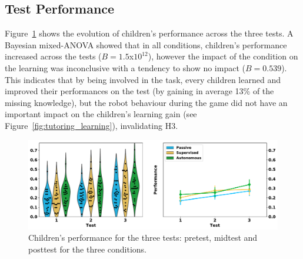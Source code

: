%


\subsection{Test Performance}

Figure~\ref{fig:tutoring_performance} shows the evolution of children's performance across the three tests. A Bayesian mixed-ANOVA showed that in all conditions, children's performance increased across the tests ($B=1.5$x$10^{12}$), however the impact of the condition on the learning was inconclusive with a tendency to show no impact ($B=0.539$). This indicates that by being involved in the task, every children learned and improved their performances on the test (by gaining in average 13\% of the missing knowledge), but the robot behaviour during the game did not have an important impact on the children's learning gain (see Figure~\ref{fig:tutoring_learning}), invalidating H3. %

\begin{figure}[ht]
	\includegraphics[width=1\linewidth]{perf.pdf}
	\centering
	\caption{Children's performance for the three tests: pretest, midtest and posttest for the three conditions.}
	\label{fig:tutoring_performance}
\end{figure}

